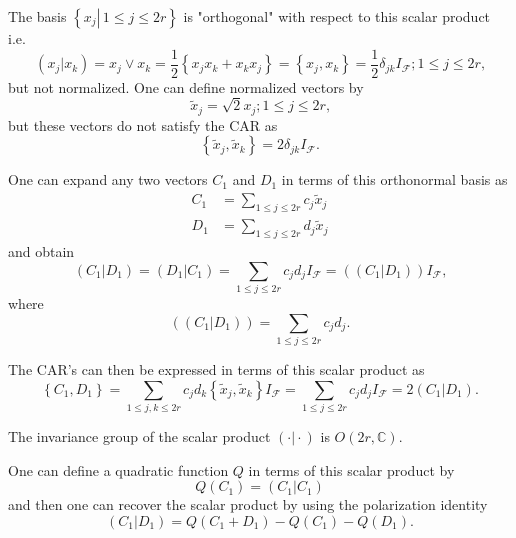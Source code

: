 \documentclass[aps, preprint]{revtex4}
\begin{document}
The basis $\left \{\left .x_{j}\right \vert \,1 \leq j \leq 2 r\right \}$ is "orthogonal" with respect to this scalar product i.e.
\begin{equation}(x_{j}\vert x_{k}) =x_{j} \vee x_{k} =\frac{1}{2} \left \{x_{j} x_{k} +x_{k} x_{j}\right \} =\left \{x_{j} ,x_{k}\right \} =\frac{1}{2} \delta _{j k} I_{\mathcal{F}} ;1 \leq j \leq 2 r\text{,}
\end{equation}but not normalized. One can define normalized vectors by
\begin{equation}\tilde{x}_{j} =\sqrt{2} x_{j} ;1 \leq j \leq 2 r\text{,}
\end{equation}but these vectors do not satisfy the CAR as
\begin{equation*}\left \{\tilde{x}_{j} ,\tilde{x}_{k}\right \} =2 \delta _{j k} I_{\mathcal{F}}\text{.}
\end{equation*}

One can expand any two vectors $C_{1}$ and $D_{1}$ in terms of this orthonormal basis as
\begin{align}C_{1} &  =\sum _{1 \leq j \leq 2 r}c_{j} \tilde{x}_{j} \\
D_{1} &  =\sum _{1 \leq j \leq 2 r}d_{j} \tilde{x}_{j}\end{align}and obtain
\begin{equation}(C_{1}\vert D_{1}) =(D_{1}\vert C_{1}) =\sum _{1 \leq j \leq 2 r}c_{j} d_{j} I_{\mathcal{F}} =\left (\left (C_{1}\vert D_{1}\right )\right ) I_{\mathcal{F}}\text{,}
\end{equation}where
\begin{equation}\left (\left (C_{1}\vert D_{1}\right )\right ) =\sum _{1 \leq j \leq 2 r}c_{j} d_{j}\text{.}
\end{equation}

The CAR's can then be expressed in terms of this scalar product as
\begin{equation}\left \{C_{1} ,D_{1}\right \} =\sum _{1 \leq j ,k \leq 2 r}c_{j} d_{k} \left \{\tilde{x}_{j} ,\tilde{x}_{k}\right \}I_{\mathcal{F}} =\sum _{1 \leq j \leq 2 r}c_{j} d_{j} I_{\mathcal{F}} =2 (C_{1}\vert D_{1})\text{.}
\end{equation}

The invariance group of the scalar product $( \cdot \vert  \cdot )$ is $O \left (2 r ,\mathbb{C}\right )\text{.}$ 

One can define a quadratic function $Q$ in terms of this scalar product by
\begin{equation}Q \left (C_{1}\right ) =\left (C_{1}\left \vert C_{1}\right .\right )
\end{equation}and then one can recover the scalar product by using the polarization identity
\begin{equation}\left (C_{1}\left \vert D_{1}\right .\right ) =Q \left (C_{1} +D_{1}\right ) -Q \left (C_{1}\right ) -Q \left (D_{1}\right )\text{.}
\end{equation}
\end{document}
